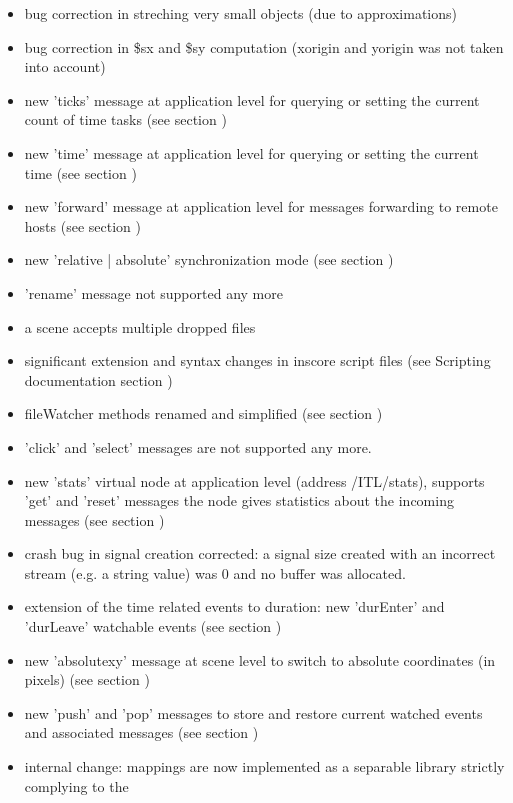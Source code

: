 \begin{itemize}
\item bug correction in streching very small objects (due to approximations)
\item bug correction in \$sx and \$sy computation (xorigin and yorigin was not taken into account)
\item new 'ticks' message at application level for querying or setting the current count of time tasks (see section )
\item new 'time' message at application level for querying or setting the current time (see section )
\item new 'forward' message at application level for messages forwarding to remote hosts (see section )
\item new 'relative | absolute' synchronization mode (see section )
\item 'rename' message not supported any more
\item a scene accepts multiple dropped files
\item significant extension and syntax changes in inscore script files (see Scripting documentation section )
\item fileWatcher methods renamed and simplified (see section )
\item 'click' and 'select' messages are not supported any more.
\item new 'stats' virtual node at application level (address /ITL/stats), supports 'get' and 'reset' messages
  the node gives statistics about the incoming messages (see section )
\item crash bug in signal creation corrected: a signal size created with an incorrect stream 
  (e.g. a string value) was 0 and no buffer was allocated.
\item extension of the time related events to duration: new 'durEnter' and 'durLeave' watchable events (see section )
\item new 'absolutexy' message at scene level to switch to absolute coordinates (in pixels) (see section )
\item new 'push' and 'pop' messages to store and restore current watched events and associated messages (see section )
\item internal change: mappings are now implemented as a separable library strictly complying to the 

\end{itemize}
